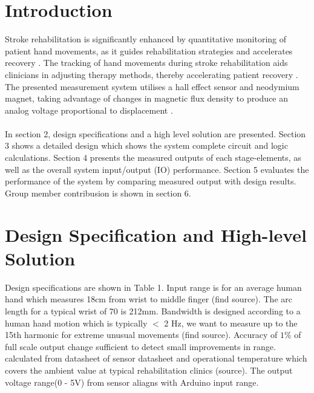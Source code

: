 \documentclass[a4paper,12pt]{article}
\begin{document}
\section{Introduction}
Stroke rehabilitation is significantly enhanced by quantitative monitoring of patient hand movements, as it guides rehabilitation strategies and accelerates recovery \cite{langhorne2011stroke}. The tracking of hand movements during stroke rehabilitation aids clinicians in adjusting therapy methods, thereby accelerating patient recovery \cite{veerbeek2014effects}. The presented measurement system utilises a hall effect sensor and neodymium magnet, taking advantage of changes in magnetic flux density to produce an analog voltage proportional to displacement \cite{popovic2013hall}.\\ \\
\noindent
In section 2, design specifications and a high level solution are presented. Section 3 shows a detailed design which shows the system complete circuit and logic calculations. Section 4 presents the measured outputs of each stage-elements, as well as the overall system input/output (IO) performance. Section 5 evaluates the performance of the system by comparing measured output with design results. Group member contribusion is shown in section 6.


%
\section{Design Specification and High-level Solution}
Design specifications are shown in Table 1. Input range is for an average human hand which measures 18cm from wrist to middle finger (find source). The arc length for a typical wrist of 70\textdegree{} is 212mm. Bandwidth is designed according to a human hand motion which is typically $<$ 2 Hz, we want to measure up to the 15th harmonic for extreme unusual movements (find source). Accuracy of $1\%$ of full scale output change sufficient to detect small improvements in range. calculated from datasheet of sensor datasheet and operational temperature which covers the ambient value at typical rehabilitation clinics (source). The output voltage range(0 - 5V) from sensor aliagns with Arduino input range.
\end{document}
